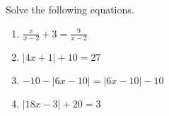 \documentclass{article}
\begin{document}
\HomeworkTitle[class={College Algebra}, number={1}, name={Linear Equations}]

Solve the following equations.

\begin{enumerate}
\item $\displaystyle\frac{x}{x - 2} + 3 = \displaystyle\frac{9}{x - 2}$ \vspace{5cm}

\item $|4x + 1| + 10 = 27$ \vspace{5cm}

\item $-10 - |6x - 10| = |6x - 10| - 10$ \vspace{5cm}

\item $|18x - 3| + 20 = 3$
\end{enumerate}
\end{document}

